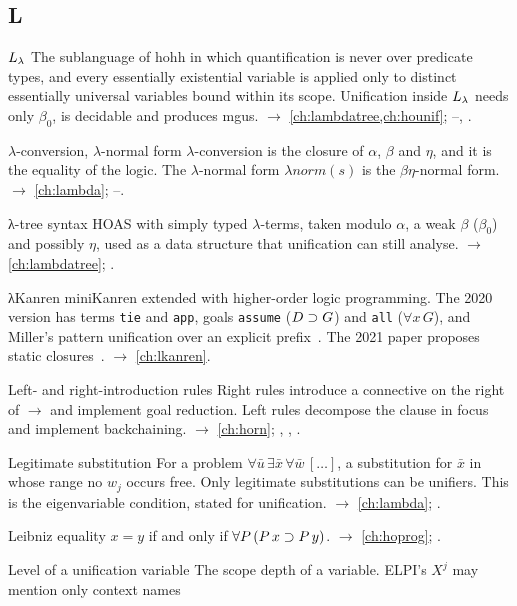 \subsection*{L}
\begin{glossarylist}
\item[$\Llam$] The sublanguage of hohh in which quantification is never over predicate types, and every
  essentially existential variable is applied only to distinct essentially universal variables bound within its
  scope. Unification inside $\Llam$ needs only $\beta_0$, is decidable and produces mgus.
  $\rightarrow$ \cref{ch:lambdatree,ch:hounif}; --, .
\item[$\lambda$-conversion, $\lambda$-normal form] $\lambda$-conversion is the closure of $\alpha$, $\beta$ and
  $\eta$, and it is the equality of the logic. The $\lambda$-normal form $\lambda norm(s)$ is the $\beta\eta$-normal
  form. $\rightarrow$ \cref{ch:lambda}; --.
\item[λ-tree syntax] HOAS with simply typed $\lambda$-terms, taken modulo $\alpha$, a weak $\beta$ ($\beta_0$) and
  possibly $\eta$, used as a data structure that unification can still analyse. $\rightarrow$
  \cref{ch:lambdatree}; .
\item[λKanren] miniKanren extended with higher-order logic programming. The 2020 version has terms \texttt{tie}
  and \texttt{app}, goals \texttt{assume} ($D\supset G$) and \texttt{all} ($\forall x\,G$), and Miller's pattern
  unification over an explicit prefix~\cite{MaLuFriedman2020}. The 2021 paper proposes static
  closures~\cite{MaFriedman2021}. $\rightarrow$ \cref{ch:lkanren}.
\item[Left- and right-introduction rules] Right rules introduce a connective on the right of $\longrightarrow$ and
  implement goal reduction. Left rules decompose the clause in focus and implement backchaining.
  $\rightarrow$ \cref{ch:horn}; , , .
\item[Legitimate substitution] For a problem $\forall\bar u\,\exists\bar x\,\forall\bar w\,[\dots]$, a substitution
  for $\bar x$ in whose range no $w_j$ occurs free. Only legitimate substitutions can be unifiers. This is the
  eigenvariable condition, stated for unification. $\rightarrow$ \cref{ch:lambda}; .
\item[Leibniz equality] $x=y$ if and only if $\forall P\,(P\,x\supset P\,y)$. $\rightarrow$ \cref{ch:hoprog};
  .
\item[Level of a unification variable] The scope depth of a variable. ELPI's $X^j$ may mention only context names

\end{glossarylist}
